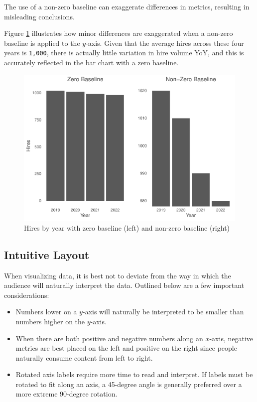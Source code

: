 \documentclass[
]{book}
\providecommand{\tightlist}{%
  \setlength{\itemsep}{0pt}\setlength{\parskip}{0pt}}
\begin{document}
The use of a non-zero baseline can exaggerate differences in metrics, resulting in misleading conclusions.

Figure \ref{fig:baseline-compare} illustrates how minor differences are exaggerated when a non-zero baseline is applied to the \(y\)-axis. Given that the average hires across these four years is \texttt{1,000}, there is actually little variation in hire volume YoY, and this is accurately reflected in the bar chart with a zero baseline.

\begin{figure}

{\centering \includegraphics[width=1\linewidth]{The_Fundamentals_of_People_Analytics_files/figure-latex/baseline-compare-1} 

}

\caption{Hires by year with zero baseline (left) and non-zero baseline (right)}\label{fig:baseline-compare}
\end{figure}

\hypertarget{intuitive-layout}{%
\subsection{Intuitive Layout}\label{intuitive-layout}}

When visualizing data, it is best not to deviate from the way in which the audience will naturally interpret the data. Outlined below are a few important considerations:

\begin{itemize}
\tightlist
\item
  Numbers lower on a \(y\)-axis will naturally be interpreted to be smaller than numbers higher on the \(y\)-axis.
\item
  When there are both positive and negative numbers along an \(x\)-axis, negative metrics are best placed on the left and positive on the right since people naturally consume content from left to right.
\item
  Rotated axis labels require more time to read and interpret. If labels must be rotated to fit along an axis, a 45-degree angle is generally preferred over a more extreme 90-degree rotation.
\end{itemize}
\end{document}
